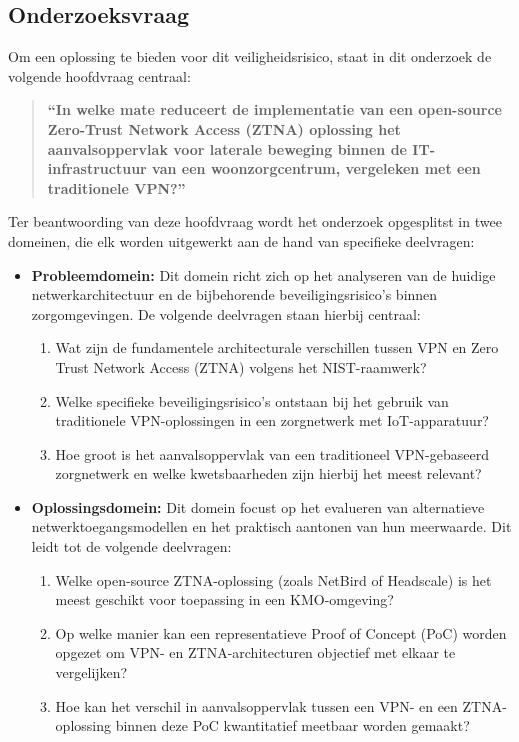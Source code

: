 \subsection{Onderzoeksvraag}
Om een oplossing te bieden voor dit veiligheidsrisico, staat in dit onderzoek de volgende hoofdvraag centraal:

\begin{quote}
	\textbf{``In welke mate reduceert de implementatie van een open-source Zero-Trust Network Access (ZTNA) oplossing het aanvalsoppervlak voor laterale beweging binnen de IT-infrastructuur van een woonzorgcentrum, vergeleken met een traditionele VPN?''}
\end{quote}

Ter beantwoording van deze hoofdvraag wordt het onderzoek opgesplitst in twee domeinen, die elk worden uitgewerkt aan de hand van specifieke deelvragen:

\begin{itemize}
	\item \textbf{Probleemdomein:} Dit domein richt zich op het analyseren van de huidige netwerkarchitectuur en de bijbehorende beveiligingsrisico’s binnen zorgomgevingen. De volgende deelvragen staan hierbij centraal:
	\begin{enumerate}
		\item Wat zijn de fundamentele architecturale verschillen tussen VPN en Zero Trust Network Access (ZTNA) volgens het NIST-raamwerk?
		\item Welke specifieke beveiligingsrisico’s ontstaan bij het gebruik van traditionele VPN-oplossingen in een zorgnetwerk met IoT-apparatuur?
		\item Hoe groot is het aanvalsoppervlak van een traditioneel VPN-gebaseerd zorgnetwerk en welke kwetsbaarheden zijn hierbij het meest relevant?
	\end{enumerate}
	
	\item \textbf{Oplossingsdomein:} Dit domein focust op het evalueren van alternatieve netwerktoegangsmodellen en het praktisch aantonen van hun meerwaarde. Dit leidt tot de volgende deelvragen:
	\begin{enumerate}
		\item Welke open-source ZTNA-oplossing (zoals NetBird of Headscale) is het meest geschikt voor toepassing in een KMO-omgeving?
		\item Op welke manier kan een representatieve Proof of Concept (PoC) worden opgezet om VPN- en ZTNA-architecturen objectief met elkaar te vergelijken?
		\item Hoe kan het verschil in aanvalsoppervlak tussen een VPN- en een ZTNA-oplossing binnen deze PoC kwantitatief meetbaar worden gemaakt?
	\end{enumerate}
\end{itemize}


